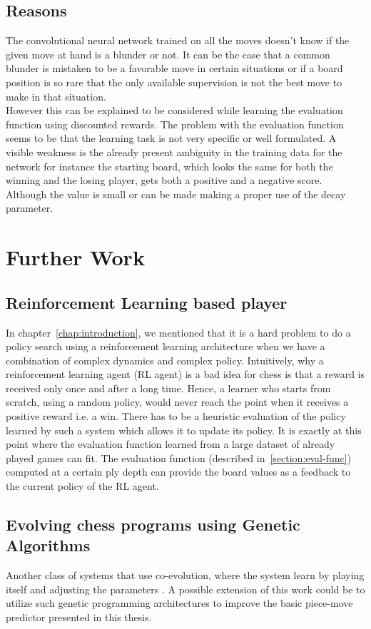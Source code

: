 \subsection{Reasons}
The convolutional neural network trained on all the moves doesn't know if the 
given move at hand is a blunder or not. It can be the case that a common 
blunder is mistaken to be a favorable move in certain situations or if a board 
position is so rare that the only available supervision is not the best move to 
make in that situation.\\

However this can be explained to be considered while learning the evaluation 
function using discounted rewards. The problem with the evaluation function 
seems to be that the learning task is not very specific or well formulated. A 
visible weakness is the already present ambiguity in the training data for the 
network for instance the starting board, which looks the same for both the 
winning and the losing player, gets both a positive and a negative score. 
Although the value is small or can be made making a proper use of the decay 
parameter. 

\section{Further Work}
\subsection{Reinforcement Learning based player}
In chapter~\ref{chap:introduction}, we mentioned that it is a hard problem 
to 
do a policy search using a reinforcement learning architecture when we have a 
combination of complex dynamics and complex policy. Intuitively, why a 
reinforcement learning agent (RL agent) is a bad idea for chess is that a 
reward is received only once and after a long time. Hence, a learner who starts 
from scratch, using a random policy, would never reach the point when it 
receives a positive reward i.e. a win. There has to be a heuristic evaluation of 
the policy learned by such a system which allows it to update its policy. It is 
exactly at this point where the evaluation function learned from a large 
dataset of already played games can fit. The evaluation function (described 
in~\ref{section:eval-func}) computed at a certain ply depth can provide the 
board values as a feedback to the 
current policy of the RL agent.

\subsection{Evolving chess programs using Genetic Algorithms}
Another class of systems that use co-evolution, where the system learn by 
playing itself 
\cite{vazquez-coello-12_evolutionary_hooke-jeeves-algo_chess-evaluation}  and 
adjusting the parameters 
\cite{bovskovic-brest-11_tuning-chess-evaluation-w-differential-evolution}. A 
possible extension of this work could be to utilize such genetic programming 
architectures to improve the basic piece-move predictor presented in this 
thesis.


